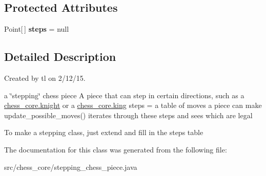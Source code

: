 \subsection*{Protected Attributes}
\begin{DoxyCompactItemize}
\item 
\hypertarget{classchess__core_1_1stepping__chess__piece_a52c2b3e29808226c7e0501e7821ac5b4}{}Point\mbox{[}$\,$\mbox{]} {\bfseries steps} = null\label{classchess__core_1_1stepping__chess__piece_a52c2b3e29808226c7e0501e7821ac5b4}

\end{DoxyCompactItemize}


\subsection{Detailed Description}
Created by tl on 2/12/15.

a \char`\"{}stepping\char`\"{} chess piece A piece that can step in certain directions, such as a \hyperlink{classchess__core_1_1knight}{chess\+\_\+core.\+knight} or a \hyperlink{classchess__core_1_1king}{chess\+\_\+core.\+king} steps = a table of moves a piece can make update\+\_\+possible\+\_\+moves() iterates through these steps and sees which are legal

To make a stepping class, just extend and fill in the steps table 

The documentation for this class was generated from the following file\+:\begin{DoxyCompactItemize}
\item 
src/chess\+\_\+core/stepping\+\_\+chess\+\_\+piece.\+java\end{DoxyCompactItemize}
